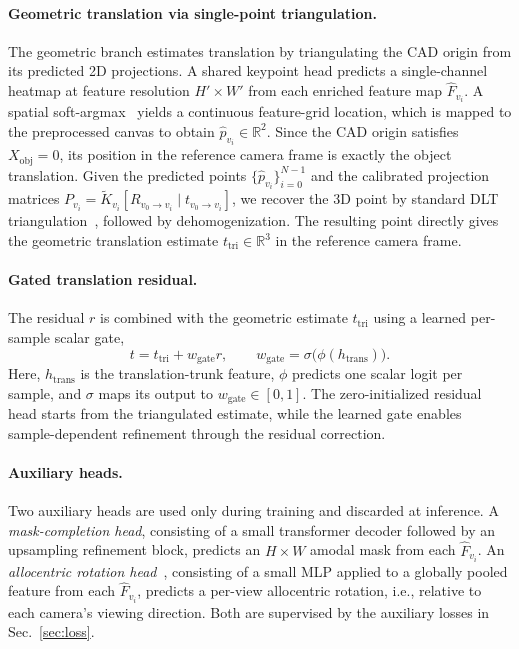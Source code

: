 \paragraph{Geometric translation via single-point triangulation.}
The geometric branch estimates translation by triangulating the CAD origin from its predicted 2D projections.
A shared keypoint head predicts a single-channel heatmap at feature resolution \(H'\times W'\) from each enriched feature map \(\hat{F}_{v_i}\).
A spatial soft-argmax~\cite{nibali2018numerical} yields a continuous feature-grid location, which is mapped to the preprocessed canvas to obtain \(\hat{p}_{v_i}\in\mathbb{R}^{2}\).
Since the CAD origin satisfies \(X_{\mathrm{obj}}=0\), its position in the reference camera frame is exactly the object translation.
Given the predicted points \(\{\hat{p}_{v_i}\}_{i=0}^{N-1}\) and the calibrated projection matrices \(P_{v_i}=\tilde{K}_{v_i}[R_{v_0\rightarrow v_i}\mid t_{v_0\rightarrow v_i}]\), we recover the 3D point by standard DLT triangulation~\cite{hartley2004multipleview}, followed by dehomogenization.
The resulting point directly gives the geometric translation estimate \(t_{\mathrm{tri}}\in\mathbb{R}^{3}\) in the reference camera frame.

\paragraph{Gated translation residual.}
\label{sec:confidence_gated_fusion}
The residual \(r\) is combined with the geometric estimate \(t_{\mathrm{tri}}\) using a learned per-sample scalar gate,
\begin{equation}
t = t_{\mathrm{tri}} + w_{\mathrm{gate}} r,
\qquad
w_{\mathrm{gate}} = \sigma\bigl(\phi(h_{\mathrm{trans}})\bigr).
\end{equation}
Here, \(h_{\mathrm{trans}}\) is the translation-trunk feature, \(\phi\) predicts one scalar logit per sample, and \(\sigma\) maps its output to \(w_{\mathrm{gate}}\in[0,1]\).
The zero-initialized residual head starts from the triangulated estimate, while the learned gate enables sample-dependent refinement through the residual correction.

\paragraph{Auxiliary heads.}
Two auxiliary heads are used only during training and discarded at inference. 
A \emph{mask-completion head}, consisting of a small transformer decoder followed by an upsampling refinement block, predicts an \(H\times W\) amodal mask from each \(\hat{F}_{v_i}\).
An \emph{allocentric rotation head}~\cite{kundu2018drcnn}, consisting of a small MLP applied to a globally pooled feature from each \(\hat{F}_{v_i}\), predicts a per-view allocentric rotation, i.e., relative to each camera's viewing direction.
Both are supervised by the auxiliary losses in Sec.~\ref{sec:loss}.

